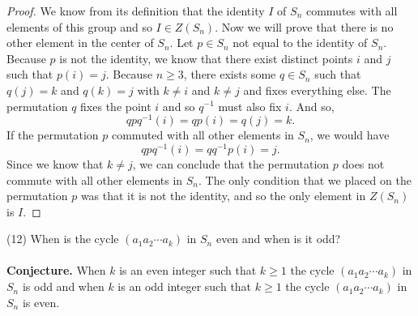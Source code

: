 \documentclass[11pt,a4paper]{article}
\begin{document}
\begin{proof}
We know from its definition that the identity $I$ of $S_n$ commutes with all elements of this group and so $I\in Z(S_n)$. Now we will prove that there is no other element in the center of $S_n$. Let $p\in S_n$ not equal to the identity of $S_n$. Because $p$ is not the identity, we know that there exist distinct points $i$ and $j$ such that $p(i) = j$. Because $n\geq 3$, there exists some $q\in S_n$ such that $q(j) = k$ and $q(k) = j$ with $k\neq i$ and $k\neq j$ and fixes everything else. The permutation $q$ fixes the point $i$ and so $q^{-1}$ must also fix $i$. And so,
\[qpq^{-1}(i) = qp(i) = q(j) = k.\]
If the permutation $p$ commuted with all other elements in $S_n$, we would have
\[qpq^{-1}(i) = qq^{-1}p(i) = j.\]
Since we know that $k\neq j$, we can conclude that the permutation $p$ does not commute with all other elements in $S_n$. The only condition that we placed on the permutation $p$ was that it is not the identity, and so the only element in $Z(S_n)$ is $I$.
\end{proof}
(12) When is the cycle $(a_1 a_2 \cdots a_k)$ in $S_n$ even and when is it odd?\\
~\\
{\bf Conjecture.} When $k$ is an even integer such that $k\geq 1$ the cycle $(a_1 a_2 \cdots a_k)$ in $S_n$ is odd and when $k$ is an odd integer such that $k\geq 1$ the cycle $(a_1 a_2 \cdots a_k)$ in $S_n$ is even.
\end{document}
